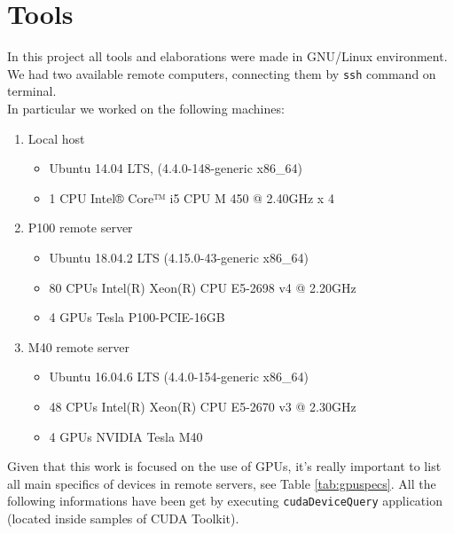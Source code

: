 \chapter{Tools} \label{chap:tools}

In this project all tools and elaborations were made in GNU/Linux environment.
We had two available remote computers, connecting them by \texttt{ssh} command on terminal.\\
In particular we worked on the following machines:

	\begin{enumerate}
		\item Local host
		\begin{itemize} 
			\item Ubuntu 14.04 LTS, (4.4.0-148-generic x86\_64)
			\item 1 CPU Intel® Core™ i5 CPU M 450 @ 2.40GHz x 4 
		\end{itemize}
		
		\item P100 remote server
		\begin{itemize}
			\item Ubuntu 18.04.2 LTS (4.15.0-43-generic x86\_64)	
			\item 80 CPUs Intel(R) Xeon(R) CPU E5-2698 v4 @ 2.20GHz		
			\item 4 GPUs Tesla P100-PCIE-16GB
		\end{itemize}
		 
		\item M40 remote server
		\begin{itemize}
			\item Ubuntu 16.04.6 LTS (4.4.0-154-generic x86\_64)
			\item 48 CPUs Intel(R) Xeon(R) CPU E5-2670 v3 @ 2.30GHz
			\item 4 GPUs NVIDIA Tesla M40\\
		\end{itemize}
	\end{enumerate}
	
	Given that this work is focused on the use of GPUs, it's really important to list all main specifics of devices in remote servers, see Table \ref{tab:gpuspecs}. All the following informations have been get by executing \texttt{cudaDeviceQuery} application (located inside samples of CUDA Toolkit).
		
